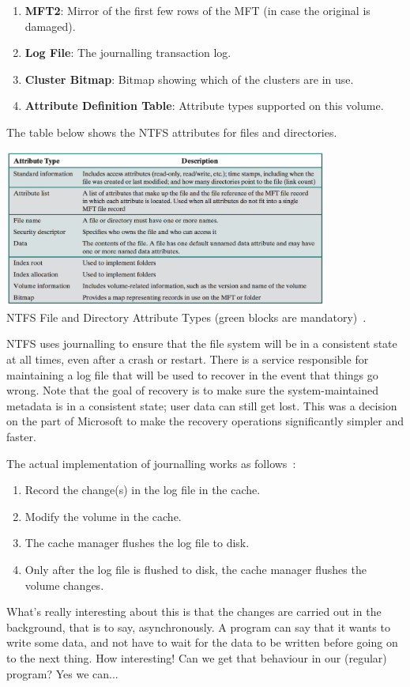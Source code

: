 \begin{enumerate}
	\item \textbf{MFT2}: Mirror of the first few rows of the MFT (in case the original is damaged).
	\item \textbf{Log File}: The journalling transaction log.
	\item \textbf{Cluster Bitmap}: Bitmap showing which of the clusters are in use.
	\item \textbf{Attribute Definition Table}: Attribute types supported on this volume.
\end{enumerate}

The table below shows the NTFS attributes for files and directories.

\begin{center}
	\includegraphics[width=0.8\textwidth]{images/ntfs-attrs.png}\\
	NTFS File and Directory Attribute Types (green blocks are mandatory)~\cite{osi}.
\end{center}

NTFS uses journalling to ensure that the file system will be in a consistent state at all times, even after a crash or restart. There is a service responsible for maintaining a log file that will be used to recover in the event that things go wrong.  Note that the goal of recovery is to make sure the system-maintained metadata is in a consistent state; user data can still get lost. This was a decision on the part of Microsoft to make the recovery operations significantly simpler and faster.

The actual implementation of journalling works as follows~\cite{russ}:

\begin{enumerate}
	\item Record the change(s) in the log file in the cache.
	\item Modify the volume in the cache.
	\item The cache manager flushes the log file to disk.
	\item Only after the log file is flushed to disk, the cache manager flushes the volume changes.
\end{enumerate}

What's really interesting about this is that the changes are carried out in the background, that is to say, asynchronously. A program can say that it wants to write some data, and not have to wait for the data to be written before going on to the next thing. How interesting! Can we get that behaviour in our (regular) program? Yes we can...



